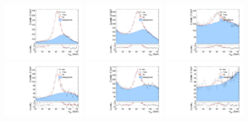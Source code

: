 \begin{figure}[htbp]
  \centering
  \includegraphics[width=0.3\textwidth]{fig/analysis/PostFit__MJJ__allC_allL_HP_Low.pdf}
  \includegraphics[width=0.3\textwidth]{fig/analysis/PostFit__MJJ__allC_allL_LP_Low.pdf}
  \includegraphics[width=0.3\textwidth]{fig/analysis/PostFit__MJJ__allC_allL_NP_Low.pdf}\\
  \includegraphics[width=0.3\textwidth]{fig/analysis/PostFit__MJJ__allC_allL_HP_Mid.pdf}
  \includegraphics[width=0.3\textwidth]{fig/analysis/PostFit__MJJ__allC_allL_LP_Mid.pdf}
  \includegraphics[width=0.3\textwidth]{fig/analysis/PostFit__MJJ__allC_allL_NP_Mid.pdf}\\

\end{figure}
